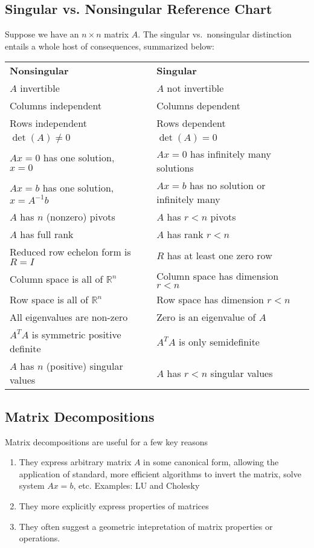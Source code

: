 \documentclass[12pt]{article}
\numberwithin{equation}{section} %
\theoremstyle{plain}
\theoremstyle{definition}
\theoremstyle{remark}
\begin{document}
\subsection{Singular vs. Nonsingular Reference Chart}

Suppose we have an $n\times n$ matrix $A$. The singular vs.\ nonsingular
distinction entails a whole host of consequences, summarized below:
\begin{table}[h!]
\centering
\begin{tabular}{lll}
\textbf{Nonsingular}                     && \textbf{Singular} \\
$A$ invertible                           && $A$ not invertible \\
Columns independent                      && Columns dependent \\
Rows independent                         && Rows dependent \\
$\det(A)\neq0$                           && $\det(A)=0$ \\
$Ax = 0$ has one solution, $x = 0$       && $Ax=0$ has infinitely many solutions\\
$Ax = b$ has one solution, $x = A^{-1}b$ && $Ax = b$ has no solution or infinitely many \\
$A$ has $n$ (nonzero) pivots             && $A$ has $r<n$ pivots \\
$A$ has full rank                        && $A$ has rank $r<n$ \\
Reduced row echelon form is $R = I$      && $R$ has at least one zero row \\
Column space is all of $\mathbb{R}^n$    && Column space has dimension $r<n$ \\
Row space is all of $\mathbb{R}^n$       && Row space has dimension $r<n$ \\
All eigenvalues are non-zero             && Zero is an eigenvalue of $A$ \\
$A^T A$ is symmetric positive definite   && $A^T A$ is only semidefinite \\
$A$ has $n$ (positive) singular values   && $A$ has $r<n$ singular values
\end{tabular}
\end{table}


\subsection{Matrix Decompositions}
\label{subsec:decomp}

Matrix decompositions are useful for a few key reasons
\begin{enumerate}
\item They express arbitrary matrix $A$ in some canonical form, allowing
  the application of standard, more efficient algorithms to invert the
  matrix, solve system $Ax =b$, etc. Examples: LU and Cholesky
\item They more explicitly express properties of matrices
\item They often suggest a geometric intepretation of matrix properties
  or operations.
\end{enumerate}
\end{document}
